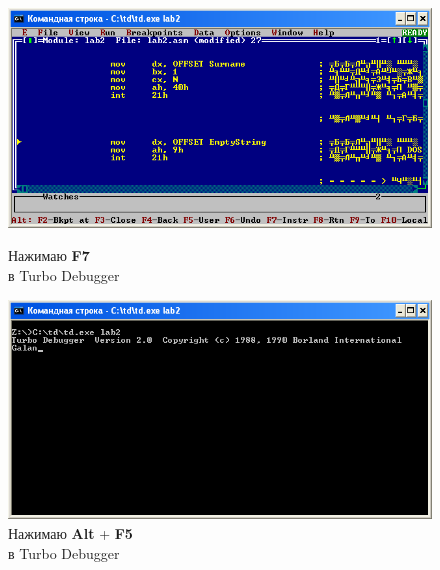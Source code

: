 \begin{figure}[!htp]
    \centering
    \begin{minipage}{0.48\textwidth}
        \centering
        \includegraphics[width=.98\linewidth]
            {../_INCLUDES/task-4-6-2/F7.png}
        \caption{Нажимаю \textbf{F7}\\в Turbo Debugger}
        \label{fig:task_4_6_2__F7}
    \end{minipage}
    \begin {minipage}{0.48\textwidth}
        \centering
        \includegraphics[width=.98\linewidth]
            {../_INCLUDES/task-4-6-2/Alt+F5.png}
        \caption{Нажимаю \textbf{Alt} + \textbf{F5}\\в Turbo Debugger}
        \label{fig:task_4_6_2__Alt_F5}
    \end{minipage}
\end{figure}
